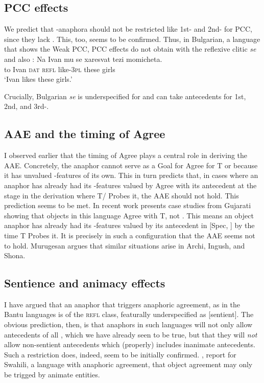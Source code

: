 \documentclass[output=paper, modfonts, nonflat]{langsci/langscibook}
\begin{document}
     \subsection{PCC effects}
  
     We predict that \nul-anaphora should not be restricted like 1st-
     and 2nd-\person{} for PCC, since they lack \person. This, too,
     seems to be confirmed. Thus, in Bulgarian, a language that shows
     the Weak PCC, PCC effects do not obtain with the reflexive clitic
     \textit{se} \citep[][500]{rivero:2004} and also
     \citet{nevins:2007}:
     \ea\label{}\gll Na Ivan mu se xaresvat tezi momicheta.\\
     to Ivan \textsc{dat} \textsc{refl} like-\textsc{3pl} these
     girls\\
     \glt `Ivan likes these girls.'  \z

 \noindent  Crucially, Bulgarian \textit{se} is underspecified for \person{}
     and can take antecedents for 1st, 2nd, and 3rd-\person.


      \subsection{AAE and the timing of Agree}

      I observed earlier that the timing of Agree plays a central role
      in deriving the AAE. Concretely, the anaphor cannot serve as a
      Goal for Agree for T or \lilv{} because it has unvalued
      \ph-features of its own. This in turn predicts that, in cases
      where an anaphor has already had its \ph-features valued by
      Agree with its antecedent at the stage in the derivation where
      T/\lilv{} Probes it, the AAE should not hold. This prediction
      seems to be met. In recent work \citet{murugesan:2018} presents
      case studies from Gujarati showing that objects in this language
      Agree with T, not \lilv. This means an object anaphor has
      already had its \ph-features valued by its antecedent in [Spec,
      \lilv] by the time T Probes it. It is precisely in such a
      configuration that the AAE seems not to hold. Murugesan argues
      that similar situations arise in Archi, Ingush, and Shona.  
      

      \subsection{Sentience and animacy effects}

      I have argued that an anaphor that triggers anaphoric agreement,
      as in the Bantu languages is of the \textsc{refl} class,
      featurally underspecified as [sentient]. The obvious prediction,
      then, is that anaphors in such languages will not only allow
      antecedents of all \person, which we have already seen to be
      true, but that they will \emph{not} allow non-sentient
      antecedents which (properly) includes inanimate
      antecedents. Such a restriction does, indeed, seem to be
      initially confirmed. \citet{woolford:1999}, \citet{vitale:1981} report
      for Swahili, a language with anaphoric agreement, that object
      agreement may only be trigged by animate entities. 
\end{document}
